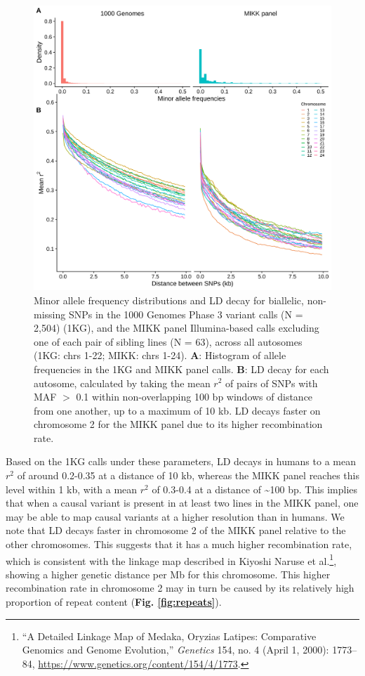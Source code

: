 \documentclass[
  9pt,
]{book}
\begin{document}
\begin{figure}
\includegraphics[width=1\linewidth]{figs/mikk_genome/08_ld_decay} \caption{Minor allele frequency distributions and LD decay for biallelic, non-missing SNPs in the 1000 Genomes Phase 3 variant calls (N = 2,504) (1KG), and the MIKK panel Illumina-based calls excluding one of each pair of sibling lines (N = 63), across all autosomes (1KG: chrs 1-22; MIKK: chrs 1-24). \textbf{A}: Histogram of allele frequencies in the 1KG and MIKK panel calls. \textbf{B}: LD decay for each autosome, calculated by taking the mean \(r^2\) of pairs of SNPs with MAF \(>\) 0.1 within non-overlapping 100 bp windows of distance from one another, up to a maximum of 10 kb. LD decays faster on chromosome 2 for the MIKK panel due to its higher recombination rate.}\label{fig:LDdecay}
\end{figure}

Based on the 1KG calls under these parameters, LD decays in humans to a mean \(r^2\) of around 0.2-0.35 at a distance of 10 kb, whereas the MIKK panel reaches this level within 1 kb, with a mean \(r^2\) of 0.3-0.4 at a distance of \textasciitilde100 bp. This implies that when a causal variant is present in at least two lines in the MIKK panel, one may be able to map causal variants at a higher resolution than in humans. We note that LD decays faster in chromosome 2 of the MIKK panel relative to the other chromosomes. This suggests that it has a much higher recombination rate, which is consistent with the linkage map described in Kiyoshi Naruse et al.\footnote{{``A {Detailed Linkage Map} of {Medaka}, {Oryzias} Latipes: {Comparative Genomics} and {Genome Evolution},''} \emph{Genetics} 154, no. 4 (April 1, 2000): 1773--84, \url{https://www.genetics.org/content/154/4/1773}.}, showing a higher genetic distance per Mb for this chromosome. This higher recombination rate in chromosome 2 may in turn be caused by its relatively high proportion of repeat content (\textbf{Fig. \ref{fig:repeats}}).
\end{document}

